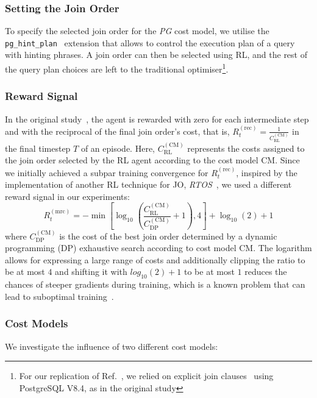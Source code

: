\documentclass[10pt, conference]{IEEEtran}
\begin{document}
\subsubsection{Setting the Join Order}
To specify the selected join order for the \emph{PG} cost model, we utilise the \texttt{pg\_hint\_plan}~\cite{pg_hint_plan} extension that allows to control the execution plan of a query with hinting phrases.
A join order can then be selected using RL, and the rest of the query plan choices are left to the traditional optimiser\footnote{%
  For our replication of Ref.~\cite{marcus18}, we relied on explicit join clauses~\cite{postgres} using PostgreSQL V8.4, as in the original study}.


\subsubsection{Reward Signal}
\label{sec:single-step-reward}
In the original study~\cite{marcus18}, the agent is rewarded with zero for each intermediate step and with the reciprocal of the final join order's cost, that is, $R_{t}^{(\text{rec})} = \frac{1}{C_{\text{RL}}^{(\text{CM})}}$ in the final timestep $T$ of an episode.
Here, $C_{\text{RL}}^{(\text{CM})}$ represents the costs assigned to the join order selected by the RL agent according to the cost model CM.
Since we initially achieved a subpar training convergence for $R_t^{(\text{rec})}$, inspired by the implementation of another RL technique for JO, \emph{RTOS}~\cite{rtos_impl}, we used a different reward signal in our experiments:
\begin{equation}
  R_t^{(\text{mrc})} = -\min\left[\log_{10}\left(\frac{C_{\text{RL}}^{(\text{CM})}}{C_{\text{DP}}^{(\text{CM})}} + 1\right), 4\right] + \log_{10}(2) + 1
\end{equation}
where $C_{\text{DP}}^{(\text{CM})}$ is the cost of the best join order determined by a dynamic programming (DP) exhaustive search according to cost model CM.
The logarithm allows for expressing a large range of costs and additionally clipping the ratio to be at most $4$ and shifting it with $log_{10}(2) + 1$ to be at most $1$ reduces the chances of steeper gradients during training, which is a known problem that can lead to suboptimal training~\cite{laud03}.

\subsubsection{Cost Models}
We investigate the influence of two different cost models:
\end{document}
